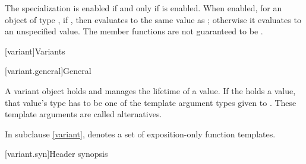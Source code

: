 \begin{itemdescr}
\pnum
The specialization  is enabled
if and only if  is enabled.
When enabled, for an object  of type ,
if , then 
evaluates to the same value as ;
otherwise it evaluates to an unspecified value.
The member functions are not guaranteed to be .
\end{itemdescr}


[variant]{Variants}

[variant.general]{General}

\pnum
A variant object holds and manages the lifetime of a value.
If the  holds a value, that value's type has to be one
of the template argument types given to .
These template arguments are called alternatives.

\pnum
In subclause \ref{variant},
 denotes
a set of exposition-only function templates.

[variant.syn]{Header  synopsis}
%

